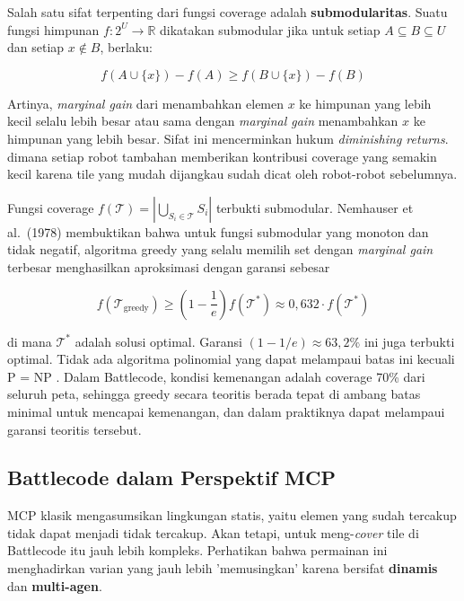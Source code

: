 Salah satu sifat terpenting dari fungsi coverage adalah \textbf{submodularitas}. Suatu fungsi himpunan $f: 2^U \to \mathbb{R}$ dikatakan submodular jika untuk setiap $A \subseteq B \subseteq U$ dan setiap $x \notin B$, berlaku:

$$f(A \cup \{x\}) - f(A) \geq f(B \cup \{x\}) - f(B)$$

Artinya, \textit{marginal gain} dari menambahkan elemen $x$ ke himpunan yang lebih kecil selalu lebih besar atau sama dengan \textit{marginal gain} menambahkan $x$ ke himpunan yang lebih besar. Sifat ini mencerminkan hukum \textit{diminishing returns}. dimana setiap robot tambahan memberikan kontribusi coverage yang semakin kecil karena tile yang mudah dijangkau sudah dicat oleh robot-robot sebelumnya.

Fungsi coverage $f(\mathcal{T}) = |\bigcup_{S_i \in \mathcal{T}} S_i|$ terbukti submodular. Nemhauser et al.\ (1978) membuktikan bahwa untuk fungsi submodular yang monoton dan tidak negatif, algoritma greedy yang selalu memilih set dengan \textit{marginal gain} terbesar menghasilkan aproksimasi dengan garansi \cite{nemhauser1978analysis} sebesar

$$f(\mathcal{T}_{\text{greedy}}) \geq \left(1 - \frac{1}{e}\right) f(\mathcal{T}^*) \approx 0{,}632 \cdot f(\mathcal{T}^*)$$

di mana $\mathcal{T}^*$ adalah solusi optimal. Garansi $(1 - 1/e) \approx 63{,}2\%$ ini juga terbukti optimal. Tidak ada algoritma polinomial yang dapat melampaui batas ini kecuali P = NP \cite{hochbaum1998analysis}. Dalam Battlecode, kondisi kemenangan adalah coverage 70\% dari seluruh peta, sehingga greedy secara teoritis berada tepat di ambang batas minimal untuk mencapai kemenangan, dan dalam praktiknya dapat melampaui garansi teoritis tersebut.

\subsection{Battlecode dalam Perspektif MCP}

MCP klasik mengasumsikan lingkungan statis, yaitu elemen yang sudah tercakup tidak dapat menjadi tidak tercakup. Akan tetapi, untuk meng-\textit{cover} tile di Battlecode itu jauh lebih kompleks. Perhatikan bahwa permainan ini menghadirkan varian yang jauh lebih 'memusingkan' karena bersifat \textbf{dinamis} dan \textbf{multi-agen}.

